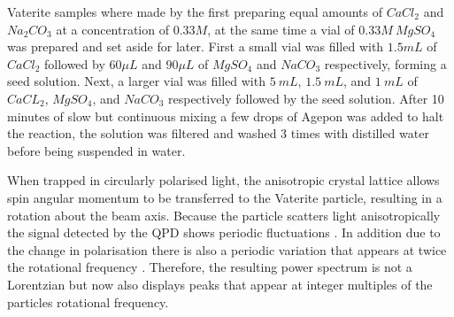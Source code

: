 Vaterite samples where made by the first preparing equal amounts 
of $CaCl_2$ and $Na_2CO_3$ at a concentration of $0.33M$, at 
the same time a vial of $0.33M\ MgSO_4$ was prepared and set 
aside for later. First a small vial was filled with $1.5mL$ of 
$CaCl_2$ followed by $60\mu L$ and $90\mu L$ of $MgSO_4$ and 
$NaCO_3$ respectively, forming a seed solution. Next, a larger 
vial was filled with $5\ mL$, $1.5\ mL$, and $1\ mL$ of $CaCL_2$, 
$MgSO_4$, and $NaCO_3$ respectively followed by the seed solution. 
After 10 minutes of slow but continuous mixing a few drops of 
Agepon was added to halt the reaction, the solution was filtered 
and washed 3 times with distilled water before being suspended 
in water.
 
When trapped in circularly polarised light, the anisotropic 
crystal lattice allows spin angular momentum to be transferred 
to the Vaterite particle, resulting in a rotation about the 
beam axis. Because the particle scatters light anisotropically 
the signal detected by the QPD shows periodic fluctuations 
\cite{Yogesha2012}. In addition due to the change in polarisation 
there is also a periodic variation that appears at twice the 
rotational frequency \cite{Monteiro2018}. Therefore, the resulting 
power spectrum is not a Lorentzian but now also displays peaks 
that appear at integer multiples of the particles rotational 
frequency. 
